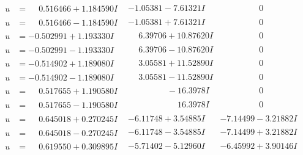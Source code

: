 \documentclass[1p]{elsarticle_modified}
\theoremstyle{definition}
\begin{document}
$$\begin{array}{c|c|c}
\begin{aligned}
u &= \phantom{-}0.516466 + 1.184590 I\end{aligned}
 & -1.05381 - 7.61321 I & \phantom{-0.000000 } 0 \\ \hline\begin{aligned}
u &= \phantom{-}0.516466 - 1.184590 I\end{aligned}
 & -1.05381 + 7.61321 I & \phantom{-0.000000 } 0 \\ \hline\begin{aligned}
u &= -0.502991 + 1.193330 I\end{aligned}
 & \phantom{-}6.39706 + 10.87620 I & \phantom{-0.000000 } 0 \\ \hline\begin{aligned}
u &= -0.502991 - 1.193330 I\end{aligned}
 & \phantom{-}6.39706 - 10.87620 I & \phantom{-0.000000 } 0 \\ \hline\begin{aligned}
u &= -0.514902 + 1.189080 I\end{aligned}
 & \phantom{-}3.05581 + 11.52890 I & \phantom{-0.000000 } 0 \\ \hline\begin{aligned}
u &= -0.514902 - 1.189080 I\end{aligned}
 & \phantom{-}3.05581 - 11.52890 I & \phantom{-0.000000 } 0 \\ \hline\begin{aligned}
u &= \phantom{-}0.517655 + 1.190580 I\end{aligned}
 & \phantom{-0.000000 } -16.3978 I & \phantom{-0.000000 } 0 \\ \hline\begin{aligned}
u &= \phantom{-}0.517655 - 1.190580 I\end{aligned}
 & \phantom{-0.000000 -}16.3978 I & \phantom{-0.000000 } 0 \\ \hline\begin{aligned}
u &= \phantom{-}0.645018 + 0.270245 I\end{aligned}
 & -6.11748 + 3.54885 I & -7.14499 - 3.21882 I \\ \hline\begin{aligned}
u &= \phantom{-}0.645018 - 0.270245 I\end{aligned}
 & -6.11748 - 3.54885 I & -7.14499 + 3.21882 I \\ \hline\begin{aligned}
u &= \phantom{-}0.619550 + 0.309895 I\end{aligned}
 & -5.71402 - 5.12960 I & -6.45992 + 3.90146 I \\ \hline\begin{aligned}

\end{aligned}
\end{array}$$
\end{document}
